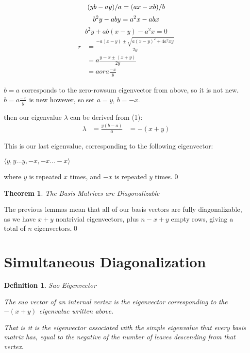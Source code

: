 \documentclass[10pt,a4paper]{report}
\newtheorem{definition}{Definition}
\newtheorem{theorem}{Theorem}
\begin{document}
\begin{equation*}
	(yb - ay)/a = (ax - xb)/b\\
\end{equation*}
\begin{equation*}
	b^2y - aby = a^2x - abx\\
\end{equation*}
\begin{equation*}
	b^2y + ab(x - y) - a^2x = 0
\end{equation*}
\begin{align*}
	r &= \frac{-a(x-y) \pm \sqrt{{a(x-y)}^2 + 4a^2xy}}{2y}\\
	  &= a\frac{y - x \pm (x + y)}{2y}\\
	  &= a or a\frac{-x}{y}
\end{align*}

$b = a$ corresponds to the zero-rowsum eigenvector from above, so it is not
new.
$b = a\frac{-x}{y}$ is new however, so set $a = y$, $b = -x$.

then our eigenvalue $\lambda$ can be derived from (1):
\begin{align*}
	\lambda &= \frac{y(b - a)}{a}
			&= -(x + y)
\end{align*}

This is our last eigenvalue, corresponding to the following eigenvector:

$\langle y, y\ldots y, -x, -x\ldots -x\rangle$

where $y$ is repeated $x$ times, and $-x$ is repeated $y$ times.\qed

\begin{theorem} The Basis Matrices are Diagonalizable \end{theorem}

The previous lemmas mean that all of our basis vectors are fully
diagonalizable, as we have $x+y$ nontrivial eigenvectors, plus $n-x+y$ empty
rows, giving a total of $n$ eigenvectors.\qed

\section{Simultaneous Diagonalization}

\begin{definition} Suo Eigenvector

	The suo vector of an internal vertex is the eigenvector corresponding to
	the $-(x+y)$ eigenvalue written above.

	That is it is the eigenvector associated with the simple eigenvalue that
	every basis matrix has, equal to the negative of the number of leaves
	descending from that vertex.
\end{definition}
\end{document}
